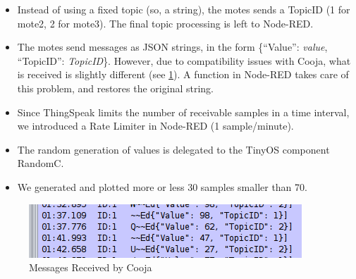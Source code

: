 \documentclass[12pt]{article}
\begin{document}
\begin{itemize}
\item Instead of using a fixed topic (so, a string), the motes sends a TopicID (1 for mote2, 2 for mote3). The final topic processing is left to Node-RED.
\item The motes send messages as JSON strings, in the form \{``Value'': \textit{value}, ``TopicID'': \textit{TopicID}\}. However, due to compatibility issues with Cooja, what is received is slightly different (see \ref{fig:messages}). A function in Node-RED takes care of this problem, and restores the original string. 
\item Since ThingSpeak limits the number of receivable samples in a time interval, we introduced a Rate Limiter in Node-RED (1 sample/minute).
\item The random generation of values is delegated to the TinyOS component RandomC.
\item We generated and plotted more or less 30 samples smaller than 70.
\end{itemize}
\begin{figure}[h]
	\centering
	\captionsetup{justification=centering}
	\includegraphics[width=\textwidth]{cooja-messages.png}	
	\caption{Messages Received by Cooja}
	\label{fig:messages}
\end{figure}
\end{document}
